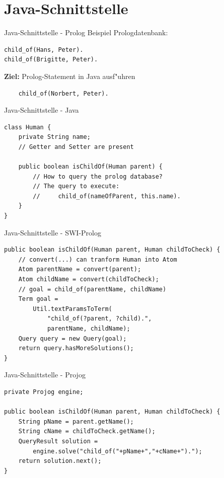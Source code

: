 \documentclass[18pt]{beamer}
\begin{document}
\section{Java-Schnittstelle}
\begin{frame}[fragile]{Java-Schnittstelle - Prolog}
Beispiel Prologdatenbank:
\begin{verbatim}
child_of(Hans, Peter).
child_of(Brigitte, Peter).
\end{verbatim}
\vspace{1cm}
\textbf{Ziel:} Prolog-Statement in Java ausf"uhren
\begin{verbatim}
    child_of(Norbert, Peter).
\end{verbatim}
\end{frame}
\begin{frame}[fragile]{Java-Schnittstelle - Java}
\begin{verbatim}
class Human {
    private String name;
    // Getter and Setter are present

    public boolean isChildOf(Human parent) {
        // How to query the prolog database?
        // The query to execute:
        //     child_of(nameOfParent, this.name).
    }	
}
\end{verbatim}
\end{frame}
\begin{frame}[fragile]{Java-Schnittstelle - SWI-Prolog}
\begin{verbatim}
public boolean isChildOf(Human parent, Human childToCheck) {
    // convert(...) can tranform Human into Atom
    Atom parentName = convert(parent);
    Atom childName = convert(childToCheck);
    // goal = child_of(parentName, childName)
    Term goal = 
        Util.textParamsToTerm(
            "child_of(?parent, ?child).", 
            parentName, childName);
    Query query = new Query(goal);
    return query.hasMoreSolutions();
}
\end{verbatim}
\end{frame}
\begin{frame}[fragile]{Java-Schnittstelle - Projog}
\begin{verbatim}
private Projog engine;

public boolean isChildOf(Human parent, Human childToCheck) {
    String pName = parent.getName();
    String cName = childToCheck.getName();
    QueryResult solution =
        engine.solve("child_of("+pName+","+cName+").");
    return solution.next();
}
\end{verbatim}
\end{frame}
\end{document}
